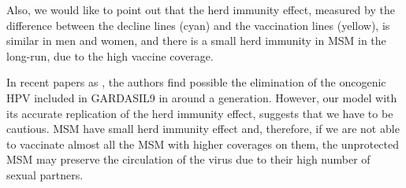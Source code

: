 Also, we would like to point out that the herd immunity effect, measured by the difference between the decline lines (cyan) and the vaccination lines (yellow), is similar in men and women, and there is a small herd immunity in MSM in the long-run, due to the high vaccine coverage.

In recent papers as \cite{Brisson2016, SIMMS2019394, BRISSON2019319}, the authors find possible the elimination of the oncogenic HPV included in GARDASIL9 in around a generation. However, our model with its accurate replication of the herd immunity effect, suggests that we have to be cautious. MSM have small herd immunity effect and, therefore, if we are not able to vaccinate almost all the MSM with higher coverages on them, the unprotected MSM may preserve the circulation of the virus due to their high number of sexual partners. 

  
